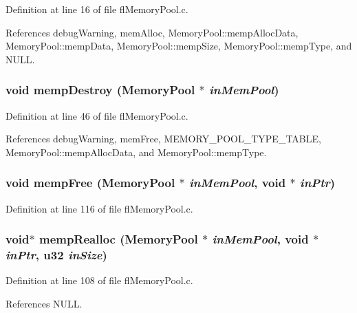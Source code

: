 Definition at line 16 of file fl\-Memory\-Pool.c.

References debug\-Warning, mem\-Alloc, Memory\-Pool::memp\-Alloc\-Data, Memory\-Pool::memp\-Data, Memory\-Pool::memp\-Size, Memory\-Pool::memp\-Type, and NULL.
\subsubsection{\setlength{\rightskip}{0pt plus 5cm}void memp\-Destroy ({\bf Memory\-Pool} $\ast$ {\em in\-Mem\-Pool})}\label{flMemoryPool_8h_4ea44cdbe9ed23b758d649449c75b8db}




Definition at line 46 of file fl\-Memory\-Pool.c.

References debug\-Warning, mem\-Free, MEMORY\_\-POOL\_\-TYPE\_\-TABLE, Memory\-Pool::memp\-Alloc\-Data, and Memory\-Pool::memp\-Type.
\subsubsection{\setlength{\rightskip}{0pt plus 5cm}void memp\-Free ({\bf Memory\-Pool} $\ast$ {\em in\-Mem\-Pool}, void $\ast$ {\em in\-Ptr})}\label{flMemoryPool_8h_a5168ffae3d62c3014e3365c997ca944}




Definition at line 116 of file fl\-Memory\-Pool.c.
\subsubsection{\setlength{\rightskip}{0pt plus 5cm}void$\ast$ memp\-Realloc ({\bf Memory\-Pool} $\ast$ {\em in\-Mem\-Pool}, void $\ast$ {\em in\-Ptr}, u32 {\em in\-Size})}\label{flMemoryPool_8h_4bf21cb48cb26dfcdd48fb0dca0ce4a0}




Definition at line 108 of file fl\-Memory\-Pool.c.

References NULL.